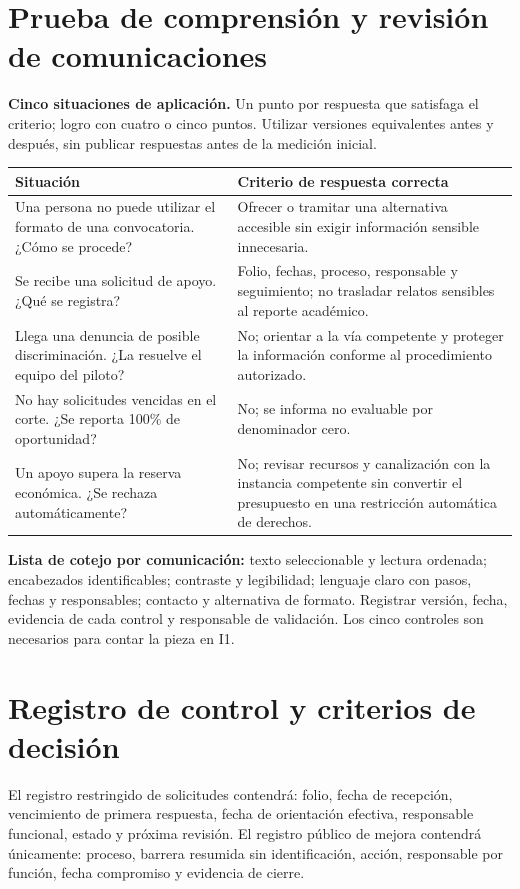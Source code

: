 \documentclass[12pt,letterpaper,oneside]{article}
\begin{document}
\section{Prueba de comprensión y revisión de comunicaciones}
\textbf{Cinco situaciones de aplicación.} Un punto por respuesta que satisfaga el criterio; logro con cuatro o cinco puntos. Utilizar versiones equivalentes antes y después, sin publicar respuestas antes de la medición inicial.
\begin{longtable}{@{}L{.43\textwidth}L{.50\textwidth}@{}}
\toprule \textbf{Situación} & \textbf{Criterio de respuesta correcta} \\
\midrule\endhead
Una persona no puede utilizar el formato de una convocatoria. ¿Cómo se procede? & Ofrecer o tramitar una alternativa accesible sin exigir información sensible innecesaria. \\
Se recibe una solicitud de apoyo. ¿Qué se registra? & Folio, fechas, proceso, responsable y seguimiento; no trasladar relatos sensibles al reporte académico. \\
Llega una denuncia de posible discriminación. ¿La resuelve el equipo del piloto? & No; orientar a la vía competente y proteger la información conforme al procedimiento autorizado. \\
No hay solicitudes vencidas en el corte. ¿Se reporta 100\% de oportunidad? & No; se informa no evaluable por denominador cero. \\
Un apoyo supera la reserva económica. ¿Se rechaza automáticamente? & No; revisar recursos y canalización con la instancia competente sin convertir el presupuesto en una restricción automática de derechos. \\
\bottomrule
\end{longtable}
\textbf{Lista de cotejo por comunicación:} texto seleccionable y lectura ordenada; encabezados identificables; contraste y legibilidad; lenguaje claro con pasos, fechas y responsables; contacto y alternativa de formato. Registrar versión, fecha, evidencia de cada control y responsable de validación. Los cinco controles son necesarios para contar la pieza en I1.

\section{Registro de control y criterios de decisión}
El registro restringido de solicitudes contendrá: folio, fecha de recepción, vencimiento de primera respuesta, fecha de orientación efectiva, responsable funcional, estado y próxima revisión. El registro público de mejora contendrá únicamente: proceso, barrera resumida sin identificación, acción, responsable por función, fecha compromiso y evidencia de cierre.
\end{document}

